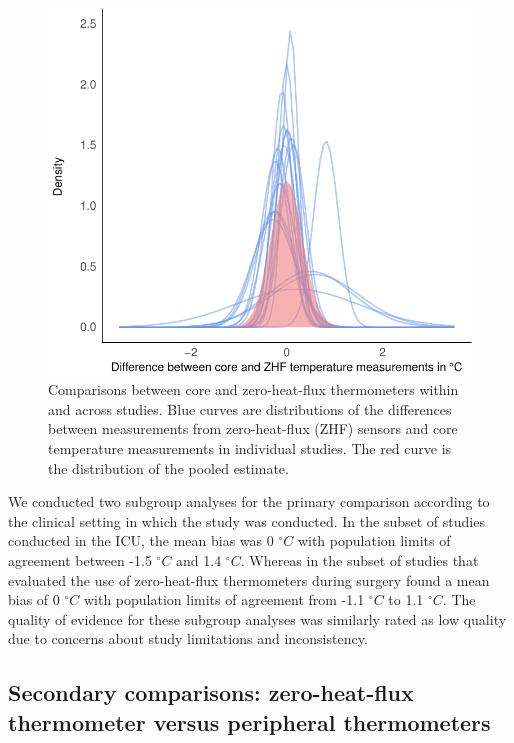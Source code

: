 \documentclass[smallextended]{svjour3}       %
\begin{document}
\begin{figure}

{\centering \includegraphics{fig-2-1} 

}

\caption{Comparisons between core and zero-heat-flux thermometers within and across studies. Blue curves are distributions of the differences between measurements from zero-heat-flux (ZHF) sensors and core temperature measurements in individual studies. The red curve is the distribution of the pooled estimate.}\label{fig:fig-2}
\end{figure}

We conducted two subgroup analyses for the primary comparison according
to the clinical setting in which the study was conducted. In the subset
of studies conducted in the ICU, the mean bias was 0 \(^\circ C\) with
population limits of agreement between -1.5 \(^\circ C\) and 1.4
\(^\circ C\). Whereas in the subset of studies that evaluated the use of
zero-heat-flux thermometers during surgery found a mean bias of 0
\(^\circ C\) with population limits of agreement from -1.1 \(^\circ C\)
to 1.1 \(^\circ C\). The quality of evidence for these subgroup analyses
was similarly rated as low quality due to concerns about study
limitations and inconsistency.

\hypertarget{secondary-comparisons-zero-heat-flux-thermometer-versus-peripheral-thermometers}{%
\subsection{Secondary comparisons: zero-heat-flux thermometer versus
peripheral
thermometers}\label{secondary-comparisons-zero-heat-flux-thermometer-versus-peripheral-thermometers}}
\end{document}
